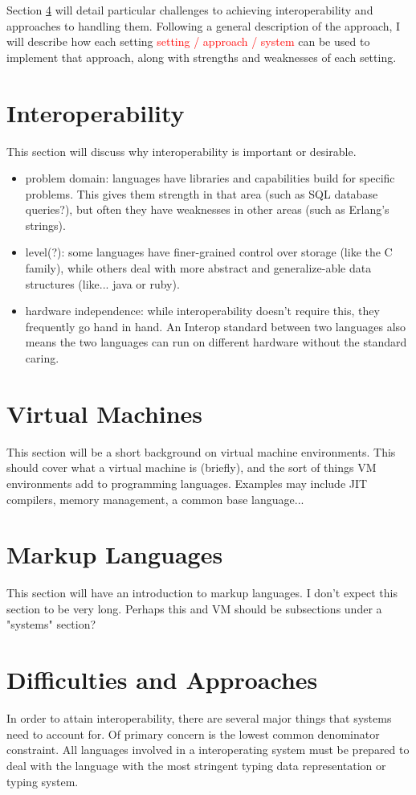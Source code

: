 \documentclass{sig-alternate}
\newcommand{\mycomment}[1]{\textcolor{red}{#1}}
\begin{document}
Section \ref{approaches} will detail particular challenges to achieving interoperability and approaches to handling them. Following a general description of the approach, I will describe how each setting \mycomment{setting / approach / system} can be used to implement that approach, along with strengths and weaknesses of each setting.


\section{Interoperability}\label{Interop}
This section will discuss why interoperability is important or desirable.
\begin{itemize}
	\item problem domain: languages have libraries and capabilities build for specific problems. This gives them strength in that area (such as SQL database queries?), but often they have weaknesses in other areas (such as Erlang's strings).
	\item level(?): some languages have finer-grained control over storage (like the C family), while others deal with more abstract and generalize-able data structures (like... java or ruby).
	\item hardware independence: while interoperability doesn't require this, they frequently go hand in hand. An Interop standard between two languages also means the two languages can run on different hardware without the standard caring.
\end{itemize}


\section{Virtual Machines}\label{VM}
This section will be a short background on virtual machine environments. This should cover what a virtual machine is (briefly), and the sort of things VM environments add to programming languages. Examples may include JIT compilers, memory management, a common base language...

\section{Markup Languages}\label{ML}
This section will have an introduction to markup languages. I don't expect this section to be very long. Perhaps this and VM should be subsections under a "systems" section?

\section{Difficulties and Approaches}\label{approaches}
In order to attain interoperability, there are several major things that systems need to account for. Of primary concern is the lowest common denominator constraint. All languages involved in a interoperating system must be prepared to deal with the language with the most stringent typing data representation or typing system. 
\end{document}
